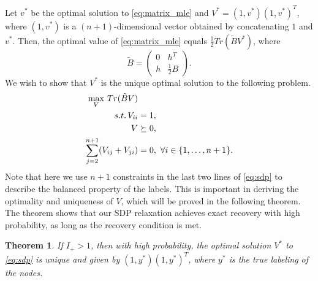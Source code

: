 \documentclass[conference]{IEEEtran}
\newtheorem{theorem}{Theorem}
\begin{document}
	Let $v^*$ be the optimal solution to \eqref{eq:matrix_mle} and $V^*=(1,v^*)(1,v^*)^T$, where $(1,v^*)$ is a $(n+1)$-dimensional  vector obtained by concatenating $1$ and $v^*$.
	Then, the optimal value of \eqref{eq:matrix_mle} equals $\frac{1}{2}Tr(\widetilde{B}V^*)$, where
	\begin{equation}\label{eq:B_lambda_def}
		\widetilde{B} = \begin{pmatrix} 0 & h^T  \\ h  & \frac{1}{2}B \end{pmatrix}.
	\end{equation}
	We wish to show that $V^*$ is the unique optimal solution to the following problem.
	\begin{align}
		\max_V\, Tr(\tilde{B}V)  &\notag\\
		s.t.\, V_{ii} &= 1, \notag\\
		V &\succeq 0, \notag\\
\sum_{j=2}^{n+1} (V_{ij} + V_{ji})& = 0,~\forall i\in\{1,\ldots,n+1\}. \label{eq:sdp}
	\end{align}
	Note that here we use $n+1$ constraints in the last two lines of \eqref{eq:sdp} to describe the balanced property of the labels. This is important in deriving the optimality and uniqueness of $V$, which will be proved in the following theorem. The theorem shows that our SDP relaxation achieves exact recovery with high probability, as long as the recovery condition is met.
	\begin{theorem}\label{thm:sdp}
		If $I_+ > 1$, then with high probability, the optimal solution
		$V^*$ to \eqref{eq:sdp} is unique and given by $(1,y^*)(1,y^*)^T$, where $y^*$ is the true labeling of the nodes.
	\end{theorem}
\end{document}
